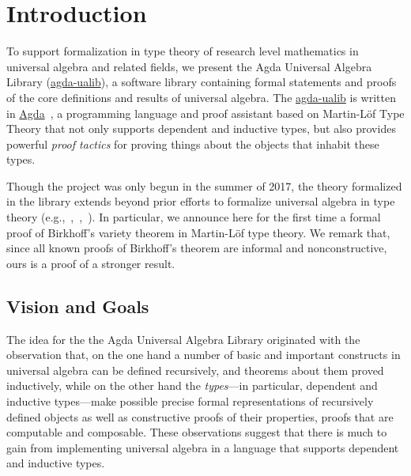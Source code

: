 \documentclass[sigplan,screen]{acmart}
\newcommand{\agda}{\href{https://wiki.portal.chalmers.se/agda/pmwiki.php}{Agda}\xspace}
\newcommand{\agdaualib}{\href{https://ualib.org}{agda-ualib}\xspace}
\newcommand{\agdaualib}{\href{anonymizedLink/agda-ualib.html}{agda-ualib}\xspace}
\begin{document}


\maketitle

\section{Introduction}\label{introduction}
To support formalization in type theory of research level mathematics in universal algebra and related fields, we present the Agda Universal Algebra Library (\agdaualib), a software library containing formal statements and proofs of the core definitions and results of universal algebra. 
The \agdaualib is written in \agda~\cite{Norell:2009}, a programming language and proof assistant based on Martin-L\"of Type Theory that not only supports dependent and inductive types, but also provides powerful \emph{proof tactics} for proving things about the objects that inhabit these types.

Though the project was only begun in the summer of 2017, the theory formalized in the library extends beyond prior efforts to formalize universal algebra in type theory (e.g.,~\cite{Gunther:2018},~\cite{Spitters:2011},~\cite{Capretta:1999}). In particular, we announce here for the first time a formal proof of Birkhoff's variety theorem in Martin-Löf type theory. We remark that, since all known proofs of Birkhoff's theorem are informal and nonconstructive, ours is a proof of a stronger result.

\subsection{Vision and Goals}\label{vision-and-goals}
The idea for the the Agda Universal Algebra Library originated with the observation that, on the one hand a number of basic and important constructs in universal algebra can be defined recursively, and theorems about them proved inductively, while on the other hand the \emph{types}---in particular, dependent and inductive types---make possible precise formal representations of recursively defined objects as well as constructive proofs of their properties, proofs that are computable and composable. These observations suggest that there is much to gain from implementing universal algebra in a language that supports dependent and inductive types.
\end{document}
